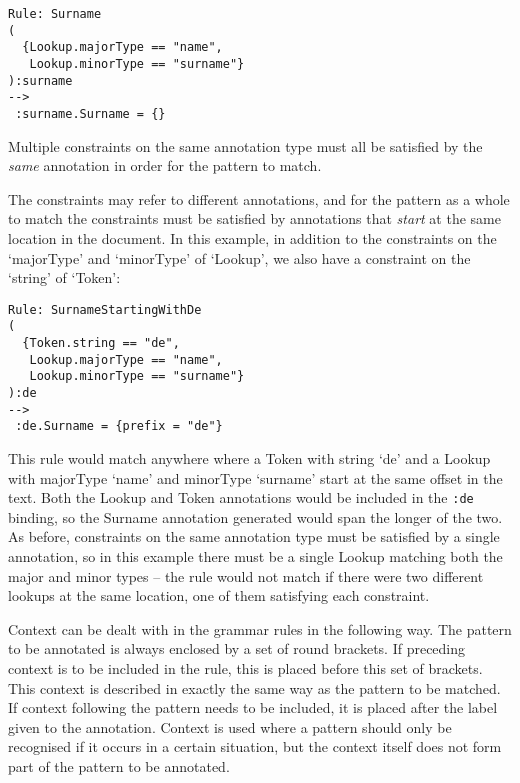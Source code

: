 \begin{small}
\begin{verbatim}
Rule: Surname
(
  {Lookup.majorType == "name",
   Lookup.minorType == "surname"}
):surname
-->
 :surname.Surname = {}
\end{verbatim}
\end{small}

Multiple constraints on the same annotation type must all be satisfied by the
{\em same} annotation in order for the pattern to match.

The constraints may refer to different annotations, and for the pattern as a
whole to match the constraints must be satisfied by annotations that
{\em start} at the same location in the document. In this example, in
addition to the constraints on the `majorType' and `minorType' of `Lookup', we
also have a constraint on the `string' of `Token':

\begin{small}
\begin{verbatim}
Rule: SurnameStartingWithDe
(
  {Token.string == "de",
   Lookup.majorType == "name",
   Lookup.minorType == "surname"}
):de
-->
 :de.Surname = {prefix = "de"}
\end{verbatim}
\end{small}

This rule would match anywhere where a Token with string `de' and a Lookup
with majorType `name' and minorType `surname' start at the same offset in
the text.  Both the Lookup and Token annotations would be included in the
\verb|:de| binding, so the Surname annotation generated would span the longer
of the two.  As before, constraints on the same annotation type must be
satisfied by a single annotation, so in this example there must be a single
Lookup matching both the major and minor types -- the rule would not match if
there were two different lookups at the same location, one of them satisfying
each constraint.


Context can be dealt with in the grammar rules in the following way.
The pattern to be annotated is always enclosed by a set of round
brackets. If preceding context is to be included in the rule, this is
placed before this set of brackets. This context is described in
exactly the same way as the pattern to be matched. If context
following the pattern needs to be included, it is placed after the
label given to the annotation. Context is used where a pattern should
only be recognised if it occurs in a certain situation, but the
context itself does not form part of the pattern to be annotated.

